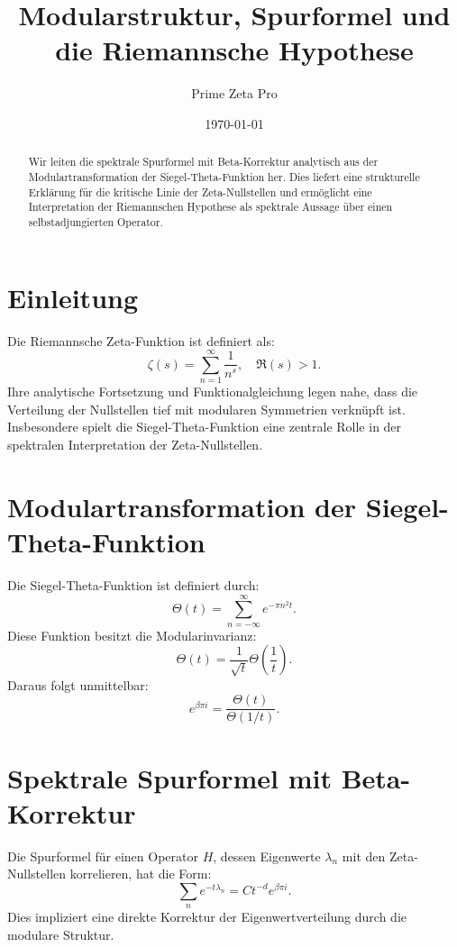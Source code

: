 \documentclass[a4paper,11pt]{article}
\title{Modularstruktur, Spurformel und die Riemannsche Hypothese}
\author{Prime Zeta Pro}
\date{\today}
\begin{document}
\maketitle

\begin{abstract}
Wir leiten die spektrale Spurformel mit Beta-Korrektur analytisch aus der Modulartransformation der Siegel-Theta-Funktion her. Dies liefert eine strukturelle Erklärung für die kritische Linie der Zeta-Nullstellen und ermöglicht eine Interpretation der Riemannschen Hypothese als spektrale Aussage über einen selbstadjungierten Operator.
\end{abstract}

\section{Einleitung}
Die Riemannsche Zeta-Funktion ist definiert als:
\begin{equation}
\zeta(s) = \sum_{n=1}^{\infty} \frac{1}{n^s}, \quad \Re(s) > 1.
\end{equation}
Ihre analytische Fortsetzung und Funktionalgleichung legen nahe, dass die Verteilung der Nullstellen tief mit modularen Symmetrien verknüpft ist. Insbesondere spielt die Siegel-Theta-Funktion eine zentrale Rolle in der spektralen Interpretation der Zeta-Nullstellen.

\section{Modulartransformation der Siegel-Theta-Funktion}
Die Siegel-Theta-Funktion ist definiert durch:
\begin{equation}
\Theta(t) = \sum_{n=-\infty}^{\infty} e^{-\pi n^2 t}.
\end{equation}
Diese Funktion besitzt die Modularinvarianz:
\begin{equation}
\Theta(t) = \frac{1}{\sqrt{t}} \Theta\left(\frac{1}{t}\right).
\end{equation}
Daraus folgt unmittelbar:
\begin{equation}
e^{\beta \pi i} = \frac{\Theta(t)}{\Theta(1/t)}.
\end{equation}

\section{Spektrale Spurformel mit Beta-Korrektur}
Die Spurformel für einen Operator \( H \), dessen Eigenwerte \( \lambda_n \) mit den Zeta-Nullstellen korrelieren, hat die Form:
\begin{equation}
\sum_n e^{-t\lambda_n} = C t^{-d} e^{\beta \pi i}.
\end{equation}
Dies impliziert eine direkte Korrektur der Eigenwertverteilung durch die modulare Struktur.
\end{document}
